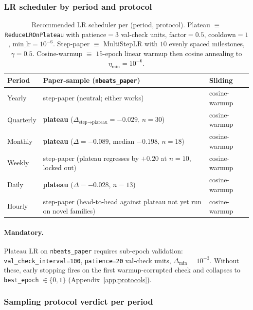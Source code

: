 \documentclass[11pt,a4paper]{article}
\begin{document}
\subsubsection{LR scheduler by period and protocol}
\label{app:hyperparams:lr}

\begin{table}[h]
\centering
\small
\caption{Recommended LR scheduler per (period, protocol). Plateau $\equiv$ \texttt{ReduceLROnPlateau} with $\text{patience}=3$ val-check units, $\text{factor}=0.5$, $\text{cooldown}=1$, $\text{min\_lr}=10^{-6}$. Step-paper $\equiv$ MultiStepLR with $10$ evenly spaced milestones, $\gamma=0.5$. Cosine-warmup $\equiv$ $15$-epoch linear warmup then cosine annealing to $\eta_{\min}=10^{-6}$.}
\label{tab:lr_per_period}
\begin{tabular}{@{}lll@{}}
\toprule
Period & Paper-sample (\texttt{nbeats\_paper}) & Sliding \\
\midrule
Yearly    & step-paper (neutral; either works) & cosine-warmup \\
Quarterly & \textbf{plateau} ($\Delta_{\text{step}\to\text{plateau}}=-0.029$, $n=30$) & cosine-warmup \\
Monthly   & \textbf{plateau} ($\Delta=-0.089$, median $-0.198$, $n=18$) & cosine-warmup \\
Weekly    & step-paper (plateau regresses by $+0.20$ at $n=10$, locked out) & cosine-warmup \\
Daily     & \textbf{plateau} ($\Delta=-0.028$, $n=13$) & cosine-warmup \\
Hourly    & step-paper (head-to-head against plateau not yet run on novel families) & cosine-warmup \\
\bottomrule
\end{tabular}
\end{table}

\paragraph{Mandatory.} Plateau LR on \texttt{nbeats\_paper} requires sub-epoch validation: \texttt{val\_check\_interval=100}, \texttt{patience=20} val-check units, $\Delta_{\min}=10^{-3}$. Without these, early stopping fires on the first warmup-corrupted check and collapses to \texttt{best\_epoch} $\in \{0, 1\}$ (Appendix~\ref{app:protocols}).

\subsubsection{Sampling protocol verdict per period}
\label{app:hyperparams:sampling}
\end{document}
